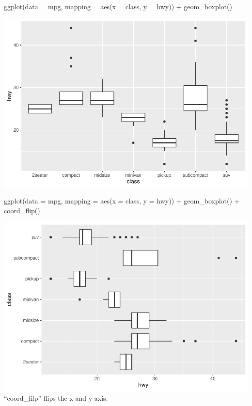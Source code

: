 \documentclass[
]{article}
\newenvironment{Shaded}{\begin{snugshade}}{\end{snugshade}}
\newcommand{\AttributeTok}[1]{\textcolor[rgb]{0.77,0.63,0.00}{#1}}
\newcommand{\FunctionTok}[1]{\textcolor[rgb]{0.00,0.00,0.00}{#1}}
\newcommand{\NormalTok}[1]{#1}
\newcommand{\SpecialCharTok}[1]{\textcolor[rgb]{0.00,0.00,0.00}{#1}}
\begin{document}
\begin{Shaded}
\begin{Highlighting}[]
\FunctionTok{ggplot}\NormalTok{(}\AttributeTok{data =}\NormalTok{ mpg, }\AttributeTok{mapping =} \FunctionTok{aes}\NormalTok{(}\AttributeTok{x =}\NormalTok{ class, }\AttributeTok{y =}\NormalTok{ hwy)) }\SpecialCharTok{+} 
  \FunctionTok{geom\_boxplot}\NormalTok{()}
\end{Highlighting}
\end{Shaded}

\includegraphics{Assignments_files/figure-latex/unnamed-chunk-53-1.pdf}

\begin{Shaded}
\begin{Highlighting}[]
\FunctionTok{ggplot}\NormalTok{(}\AttributeTok{data =}\NormalTok{ mpg, }\AttributeTok{mapping =} \FunctionTok{aes}\NormalTok{(}\AttributeTok{x =}\NormalTok{ class, }\AttributeTok{y =}\NormalTok{ hwy)) }\SpecialCharTok{+} 
  \FunctionTok{geom\_boxplot}\NormalTok{() }\SpecialCharTok{+}
  \FunctionTok{coord\_flip}\NormalTok{()}
\end{Highlighting}
\end{Shaded}

\includegraphics{Assignments_files/figure-latex/unnamed-chunk-53-2.pdf}
``coord\_filp'' flips the x and y axis.
\end{document}

